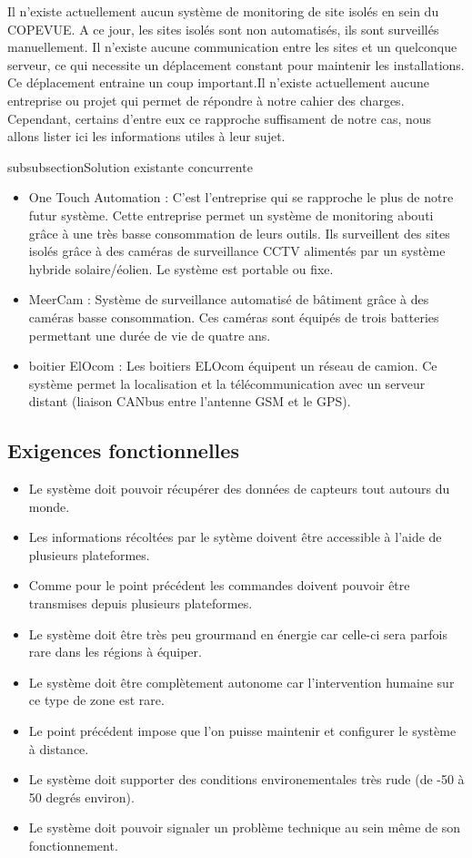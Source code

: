 Il n'existe actuellement aucun système de monitoring de site isolés en sein du COPEVUE. A ce jour, les sites isolés sont non automatisés, ils sont surveillés manuellement. Il n'existe aucune communication entre les sites et un quelconque serveur, ce qui necessite un déplacement constant pour maintenir les installations. Ce déplacement entraine un coup important.Il n'existe actuellement aucune entreprise ou projet qui permet de répondre à notre cahier des charges. Cependant, certains d'entre eux ce rapproche suffisament de notre cas, nous allons lister ici les informations utiles à leur sujet.

subsubsection{Solution existante concurrente}

\begin{itemize}
\item One Touch Automation :
C'est l'entreprise qui se rapproche le plus de notre futur système. Cette entreprise permet un système de monitoring abouti grâce à une très basse consommation de leurs outils. Ils surveillent des sites isolés grâce à des caméras de surveillance CCTV alimentés par un système hybride solaire/éolien. Le système est portable ou fixe.
\item MeerCam :
Système de surveillance automatisé de bâtiment grâce à des caméras basse consommation. Ces caméras sont équipés de trois batteries permettant une durée de vie de quatre ans.
\item boitier ElOcom :
Les boitiers ELOcom équipent un réseau de camion. Ce système permet la localisation et la télécommunication avec un serveur distant (liaison CANbus entre l'antenne GSM et le GPS).
\end{itemize}

    \subsection{Exigences fonctionnelles}

\begin{itemize}
\item Le système doit pouvoir récupérer des données de capteurs tout autours du monde.
\item Les informations récoltées par le sytème doivent être accessible à l'aide de plusieurs plateformes.
\item Comme pour le point précédent les commandes doivent pouvoir être transmises depuis plusieurs plateformes.
\item Le système doit être très peu grourmand en énergie car celle-ci sera parfois rare dans les régions à équiper.
\item Le système doit être complètement autonome car l'intervention humaine sur ce type de zone est rare.
\item Le point précédent impose que l'on puisse maintenir et configurer le système à distance.
\item Le système doit supporter des conditions environementales très rude (de -50 à 50 degrés environ).
\item Le système doit pouvoir signaler un problème technique au sein même de son fonctionnement.
\end{itemize}

